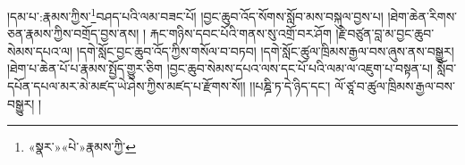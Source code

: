 །དམ་པ་:རྣམས་ཀྱིས་\footnote{«སྣར་»«པེ་»རྣམས་ཀྱི་}བཤད་པའི་ལམ་བཟང་པོ། །བྱང་ཆུབ་འོད་སོགས་སློབ་མས་བསྐུལ་བྱས་པ། །ཐེག་ཆེན་རིགས་ཅན་རྣམས་ཀྱིས་བགྲོད་བྱས་ནས། །
རྐང་གཉིས་དབང་པོའི་གནས་སུ་འགྲོ་བར་ཤོག །རྗེ་བཙུན་བླ་མ་བྱང་ཆུབ་སེམས་དཔའ་ལ། །དགེ་སློང་བྱང་ཆུབ་འོད་ཀྱིས་གསོལ་བ་བཏབ། །དགེ་སློང་ཚུལ་ཁྲིམས་རྒྱལ་བས་ཞུས་ནས་བསྒྱུར། །ཐེག་པ་ཆེན་པོ་པ་རྣམས་སྤྱོད་གྱུར་ཅིག །བྱང་ཆུབ་སེམས་དཔའ་ལས་དང་པོ་པའི་ལམ་ལ་འཇུག་པ་བསྟན་པ། སློབ་དཔོན་དཔལ་མར་མེ་མཛད་ཡེ་ཤེས་ཀྱིས་མཛད་པ་རྫོགས་སོ།། །།པཎྜི་ཏ་དེ་ཉིད་དང་། ལོ་ཙཱ་བ་ཚུལ་ཁྲིམས་རྒྱལ་བས་བསྒྱུར། ། 
